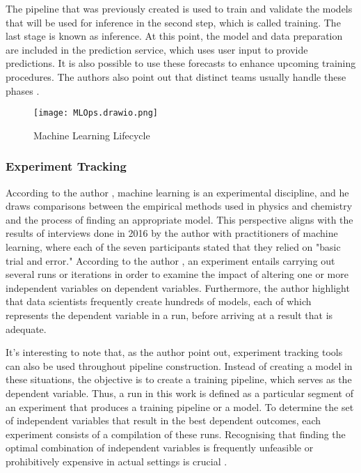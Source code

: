 \documentclass[12pt]{article}
\begin{document}
The pipeline that was previously created is used to train and validate the models that will be used for inference in the second step, which is called training. The last stage is known as inference. At this point, the model and data preparation are included in the prediction service, which uses user input to provide predictions. It is also possible to use these forecasts to enhance upcoming training procedures. The authors also point out that distinct teams usually handle these phases \cite{garcia2018context}.

\begin{figure}[h!t]
\centering
\texttt{[image: MLOps.drawio.png]}
\caption{Machine Learning Lifecycle}
\label{fig:mlops}
\end{figure}

\subsubsection{Experiment Tracking}
According to the author \cite{langley1988machine}, machine learning is an experimental discipline, and he draws comparisons between the empirical methods used in physics and chemistry and the process of finding an appropriate model. This perspective aligns with the results of interviews done in 2016 by the author \cite{hill2016trials} with practitioners of machine learning, where each of the seven participants stated that they relied on "basic trial and error." According to the author \cite{langley1988machine}, an experiment entails carrying out several runs or iterations in order to examine the impact of altering one or more independent variables on dependent variables. Furthermore, the author \cite{vartak2016modeldb} highlight that data scientists frequently create hundreds of models, each of which represents the dependent variable in a run, before arriving at a result that is adequate.

It's interesting to note that, as the author \cite{garcia2018context} point out, experiment tracking tools can also be used throughout pipeline construction. Instead of creating a model in these situations, the objective is to create a training pipeline, which serves as the dependent variable. Thus, a run in this work is defined as a particular segment of an experiment that produces a training pipeline or a model. To determine the set of independent variables that result in the best dependent outcomes, each experiment consists of a compilation of these runs. Recognising that finding the optimal combination of independent variables is frequently unfeasible or prohibitively expensive in actual settings is crucial \cite{goodfellow2016deep}.
\end{document}
